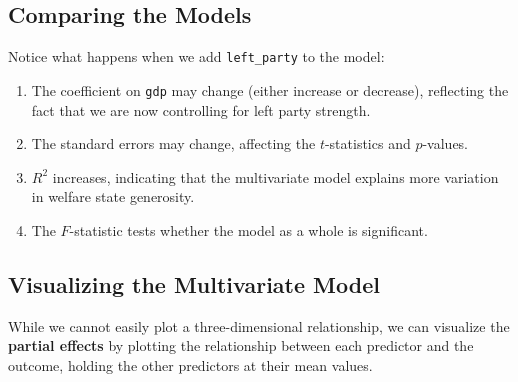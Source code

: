 \documentclass[
  letterpaper,
  DIV=11,
  numbers=noendperiod]{scrreprt}
\providecommand{\tightlist}{%
  \setlength{\itemsep}{0pt}\setlength{\parskip}{0pt}}
\begin{document}
\subsection{Comparing the Models}\label{comparing-the-models}

Notice what happens when we add \texttt{left\_party} to the model:

\begin{enumerate}
\def\labelenumi{\arabic{enumi}.}
\tightlist
\item
  The coefficient on \texttt{gdp} may change (either increase or
  decrease), reflecting the fact that we are now controlling for left
  party strength.
\item
  The standard errors may change, affecting the \(t\)-statistics and
  \(p\)-values.
\item
  \(R^2\) increases, indicating that the multivariate model explains
  more variation in welfare state generosity.
\item
  The \(F\)-statistic tests whether the model as a whole is significant.
\end{enumerate}

\subsection{Visualizing the Multivariate
Model}\label{visualizing-the-multivariate-model}

While we cannot easily plot a three-dimensional relationship, we can
visualize the \textbf{partial effects} by plotting the relationship
between each predictor and the outcome, holding the other predictors at
their mean values.
\end{document}
